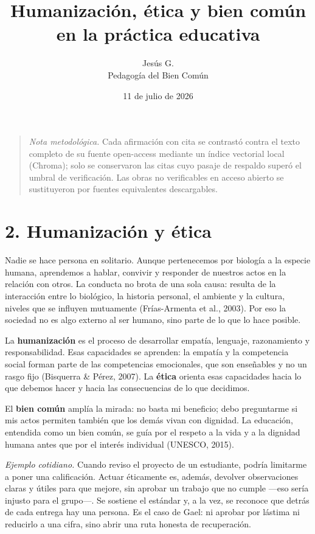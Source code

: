 \documentclass[12pt]{article}
\title{\vspace{-2em}\bfseries Humanización, ética y bien común en la práctica educativa}
\author{Jesús G.\\[2pt]\normalsize Pedagogía del Bien Común}
\date{11 de julio de 2026}
\newcommand{\cita}[1]{\textup{(#1)}}
\begin{document}
\maketitle
\thispagestyle{empty}

\begin{quote}\small
\noindent\textit{Nota metodológica.} Cada afirmación con cita se contrastó contra el
texto completo de su fuente \mbox{open-access} mediante un índice vectorial local
(Chroma); solo se conservaron las citas cuyo pasaje de respaldo superó el umbral de
verificación. Las obras no verificables en acceso abierto se sustituyeron por fuentes
equivalentes descargables.
\end{quote}

\vspace{0.5em}

\section*{2. Humanización y ética}

Nadie se hace persona en solitario. Aunque pertenecemos por biología a la especie
humana, aprendemos a hablar, convivir y responder de nuestros actos en la relación con
otros. La conducta no brota de una sola causa: resulta de la interacción entre lo
biológico, la historia personal, el ambiente y la cultura, niveles que se influyen
mutuamente \cita{Frías-Armenta et al., 2003}. Por eso la sociedad no es algo externo al
ser humano, sino parte de lo que lo hace posible.

La \textbf{humanización} es el proceso de desarrollar empatía, lenguaje, razonamiento y
responsabilidad. Esas capacidades se aprenden: la empatía y la competencia social forman
parte de las competencias emocionales, que son enseñables y no un rasgo fijo
\cita{Bisquerra \& Pérez, 2007}. La \textbf{ética} orienta esas capacidades hacia lo que
debemos hacer y hacia las consecuencias de lo que decidimos.

El \textbf{bien común} amplía la mirada: no basta mi beneficio; debo preguntarme si mis
actos permiten también que los demás vivan con dignidad. La educación, entendida como un
bien común, se guía por el respeto a la vida y a la dignidad humana antes que por el
interés individual \cita{UNESCO, 2015}.

\textit{Ejemplo cotidiano.} Cuando reviso el proyecto de un estudiante, podría limitarme a
poner una calificación. Actuar éticamente es, además, devolver observaciones claras y
útiles para que mejore, sin aprobar un trabajo que no cumple ---eso sería injusto para el
grupo---. Se sostiene el estándar y, a la vez, se reconoce que detrás de cada entrega hay
una persona. Es el caso de Gael: ni aprobar por lástima ni reducirlo a una cifra, sino
abrir una ruta honesta de recuperación.
\end{document}
